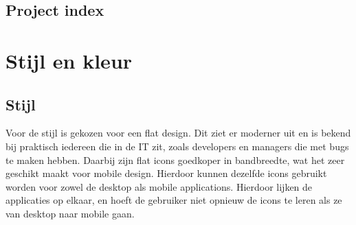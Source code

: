\documentclass[11pt,english]{article}
\begin{document}
  \subsection{Project index}

  \section{Stijl en kleur}
  \subsection{Stijl}
  Voor de stijl is gekozen voor een flat design. Dit ziet er moderner uit en is
  bekend bij praktisch iedereen die in de IT zit, zoals developers en managers
  die met bugs te maken hebben. Daarbij zijn flat icons goedkoper in
  bandbreedte, wat het zeer geschikt maakt voor mobile design. Hierdoor kunnen
  dezelfde icons gebruikt worden voor zowel de desktop als mobile applications.
  Hierdoor lijken de applicaties op elkaar, en hoeft de gebruiker niet opnieuw
  de icons te leren als ze van desktop naar mobile gaan.
\end{document}
